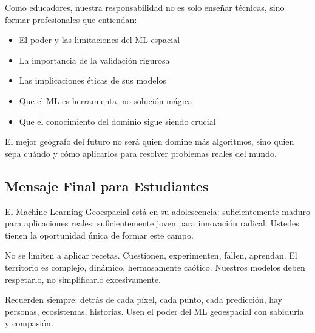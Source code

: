 \documentclass[12pt,a4paper]{article}
\begin{document}
\begin{reflexion}
Como educadores, nuestra responsabilidad no es solo enseñar técnicas, sino formar profesionales que entiendan:
\begin{itemize}
    \item El poder y las limitaciones del ML espacial
    \item La importancia de la validación rigurosa
    \item Las implicaciones éticas de sus modelos
    \item Que el ML es herramienta, no solución mágica
    \item Que el conocimiento del dominio sigue siendo crucial
\end{itemize}

El mejor geógrafo del futuro no será quien domine más algoritmos, sino quien sepa cuándo y cómo aplicarlos para resolver problemas reales del mundo.
\end{reflexion}

\subsection{Mensaje Final para Estudiantes}

El Machine Learning Geoespacial está en su adolescencia: suficientemente maduro para aplicaciones reales, suficientemente joven para innovación radical. Ustedes tienen la oportunidad única de formar este campo.

No se limiten a aplicar recetas. Cuestionen, experimenten, fallen, aprendan. El territorio es complejo, dinámico, hermosamente caótico. Nuestros modelos deben respetarlo, no simplificarlo excesivamente.

Recuerden siempre: detrás de cada píxel, cada punto, cada predicción, hay personas, ecosistemas, historias. Usen el poder del ML geoespacial con sabiduría y compasión.
\end{document}
